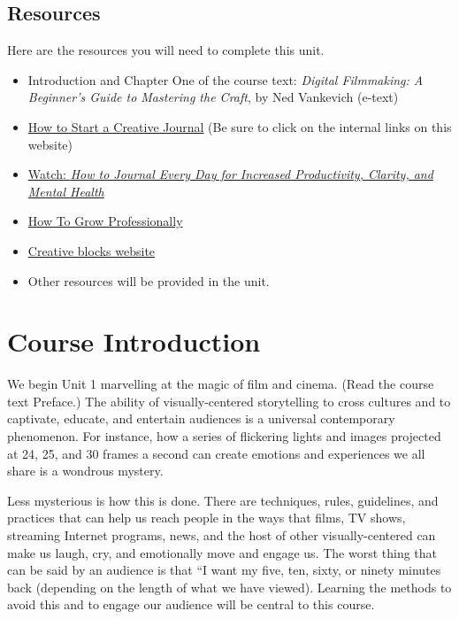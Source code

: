 \documentclass[
  letterpaper,
  DIV=11,
  numbers=noendperiod]{scrreprt}
\providecommand{\tightlist}{%
  \setlength{\itemsep}{0pt}\setlength{\parskip}{0pt}}\usepackage{longtable,booktabs,array}
\begin{document}
\subsection*{Resources}\label{resources}

Here are the resources you will need to complete this unit.

\begin{itemize}
\tightlist
\item
  Introduction and Chapter One of the course text: \emph{Digital
  Filmmaking: A Beginner's Guide to Mastering the Craft}, by Ned
  Vankevich (e-text)
\item
  \href{https://karenbanes.com/how-to-start-a-creative-journal}{How to
  Start a Creative Journal} (Be sure to click on the internal links on
  this website)
\item
  \href{https://www.youtube.com/watch?v=hUTWo7_W0lc}{Watch: \emph{How to
  Journal Every Day for Increased Productivity, Clarity, and Mental
  Health}}
\item
  \href{https://brandyourself.com/blog/guide/how-to-grow-professionally/}{How
  To Grow Professionally}
\item
  \href{https://www.goodtherapy.org/learn-about-therapy/issues/creative-blocks}{Creative
  blocks website}
\item
  Other resources will be provided in the unit.
\end{itemize}

\section{Course Introduction}\label{course-introduction}

We begin Unit 1 marvelling at the magic of film and cinema. (Read the
course text Preface.) The ability of visually-centered storytelling to
cross cultures and to captivate, educate, and entertain audiences is a
universal contemporary phenomenon. For instance, how a series of
flickering lights and images projected at 24, 25, and 30 frames a second
can create emotions and experiences we all share is a wondrous mystery.

Less mysterious is how this is done. There are techniques, rules,
guidelines, and practices that can help us reach people in the ways that
films, TV shows, streaming Internet programs, news, and the host of
other visually-centered can make us laugh, cry, and emotionally move and
engage us. The worst thing that can be said by an audience is that ``I
want my five, ten, sixty, or ninety minutes back (depending on the
length of what we have viewed). Learning the methods to avoid this and
to engage our audience will be central to this course.
\end{document}
